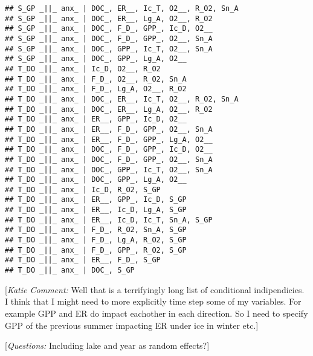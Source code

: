 \documentclass[
]{article}
\begin{document}
\begin{verbatim}
## S_GP _||_ anx_ | DOC_, ER__, Ic_T, O2__, R_O2, Sn_A
## S_GP _||_ anx_ | DOC_, ER__, Lg_A, O2__, R_O2
## S_GP _||_ anx_ | DOC_, F_D_, GPP_, Ic_D, O2__
## S_GP _||_ anx_ | DOC_, F_D_, GPP_, O2__, Sn_A
## S_GP _||_ anx_ | DOC_, GPP_, Ic_T, O2__, Sn_A
## S_GP _||_ anx_ | DOC_, GPP_, Lg_A, O2__
## T_DO _||_ anx_ | Ic_D, O2__, R_O2
## T_DO _||_ anx_ | F_D_, O2__, R_O2, Sn_A
## T_DO _||_ anx_ | F_D_, Lg_A, O2__, R_O2
## T_DO _||_ anx_ | DOC_, ER__, Ic_T, O2__, R_O2, Sn_A
## T_DO _||_ anx_ | DOC_, ER__, Lg_A, O2__, R_O2
## T_DO _||_ anx_ | ER__, GPP_, Ic_D, O2__
## T_DO _||_ anx_ | ER__, F_D_, GPP_, O2__, Sn_A
## T_DO _||_ anx_ | ER__, F_D_, GPP_, Lg_A, O2__
## T_DO _||_ anx_ | DOC_, F_D_, GPP_, Ic_D, O2__
## T_DO _||_ anx_ | DOC_, F_D_, GPP_, O2__, Sn_A
## T_DO _||_ anx_ | DOC_, GPP_, Ic_T, O2__, Sn_A
## T_DO _||_ anx_ | DOC_, GPP_, Lg_A, O2__
## T_DO _||_ anx_ | Ic_D, R_O2, S_GP
## T_DO _||_ anx_ | ER__, GPP_, Ic_D, S_GP
## T_DO _||_ anx_ | ER__, Ic_D, Lg_A, S_GP
## T_DO _||_ anx_ | ER__, Ic_D, Ic_T, Sn_A, S_GP
## T_DO _||_ anx_ | F_D_, R_O2, Sn_A, S_GP
## T_DO _||_ anx_ | F_D_, Lg_A, R_O2, S_GP
## T_DO _||_ anx_ | F_D_, GPP_, R_O2, S_GP
## T_DO _||_ anx_ | ER__, F_D_, S_GP
## T_DO _||_ anx_ | DOC_, S_GP
\end{verbatim}

{ {[}\emph{Katie Comment:} Well that is a terrifyingly long list of
conditional indipendicies. I think that I might need to more explicitly
time step some of my variables. For example GPP and ER do impact
eachother in each direction. So I need to specify GPP of the previous
summer impacting ER under ice in winter etc.{]} }

{ {[}\emph{Questions:} Including lake and year as random effects?{]}}
\end{document}
